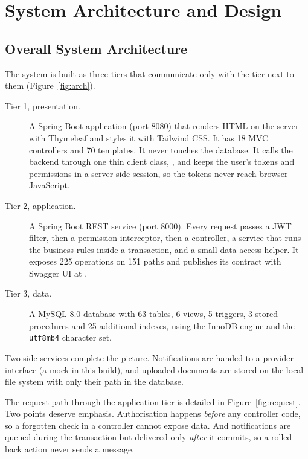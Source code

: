 \chapter{System Architecture and Design}\label{ch:design}

\section{Overall System Architecture}
The system is built as three tiers that communicate only with the tier next to them
(Figure~\ref{fig:arch}).


\begin{description}
\item[Tier 1, presentation.] A Spring Boot application (port 8080) that renders HTML on
the server with Thymeleaf and styles it with Tailwind CSS. It has 18 MVC controllers and
70 templates. It never touches the database. It calls the backend through one thin client
class, , and keeps the user's tokens and permissions in a server-side
session, so the tokens never reach browser JavaScript.
\item[Tier 2, application.] A Spring Boot REST service (port 8000). Every request passes
a JWT filter, then a permission interceptor, then a controller, a service that runs the
business rules inside a transaction, and a small data-access helper. It exposes 225
operations on 151 paths and publishes its contract with Swagger UI at .
\item[Tier 3, data.] A MySQL 8.0 database with 63 tables, 6 views, 5 triggers, 3 stored
procedures and 25 additional indexes, using the InnoDB engine and the \texttt{utf8mb4}
character set.
\end{description}
Two side services complete the picture. Notifications are handed to a provider interface
(a mock in this build), and uploaded documents are stored on the local file system with
only their path in the database.

The request path through the application tier is detailed in Figure~\ref{fig:request}.
Two points deserve emphasis. Authorisation happens \emph{before} any controller code, so a
forgotten check in a controller cannot expose data. And notifications are queued during the
transaction but delivered only \emph{after} it commits, so a rolled-back action never
sends a message.


